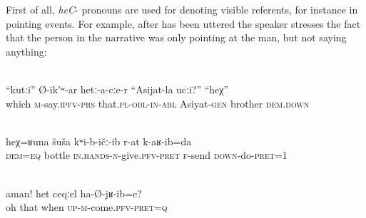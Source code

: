 First of all, \textit{heC}- pronouns are used for denoting visible referents, for instance in pointing events. For example, after  has been uttered the speaker stresses the fact that the person in the narrative was only pointing at the man, but not saying anything:
%
\begin{exe}
	\\	\label{Who, he says to them, is Asijats brother? This one}
	\gll	``kutːi''	Ø-ik'ʷ-ar	hetː-a-cːe-r	``Asijat-la	ucːi?'' 	``heχ'' \\
		which	\textsc{m}-say.\textsc{ipfv}-\textsc{prs}	that.\textsc{pl}-\textsc{obl-in}-\textsc{abl}	Asiyat-\textsc{gen}	brother \textsc{dem.down}\\
	\glt	{}

	 \\	\label{He gave me such a bottle and sent me away}
	\gll	heχ=ʁuna	šuša	kʷi-b-ičː-ib	r-at	k-aʁ-ib=da\\
		\textsc{dem=eq}	bottle	\textsc{in.hands}-\textsc{n}-give.\textsc{pfv}-\textsc{pret}	\textsc{f}-send	\textsc{down}-do-\textsc{pret}=1 \\
	\glt	{}

	\\	\label{[referring to a boy that turned up unexpectedly during the conversation}
	\gll	aman!		het	ceqːel	ha-Ø-jʁ-ib=e?\\
		oh		that	when	\textsc{up}-\textsc{m}-come.\textsc{pfv}-\textsc{pret}=\textsc{q}\\
	\glt	{}
\end{exe}

